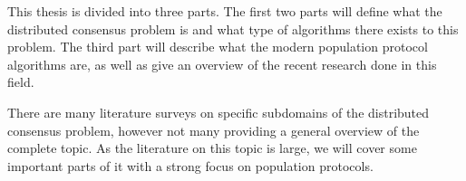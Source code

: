 This thesis is divided into three parts. The first two parts will define what the distributed consensus problem is and what type of algorithms there exists to this problem. The third part will describe what the modern population protocol algorithms are, as well as give an overview of the recent research done in this field.

There are many literature surveys on specific subdomains of the distributed consensus problem, however not many providing a general overview of the complete topic. As the literature on this topic is large, we will cover some important parts of it with a strong focus on population protocols.



\clearpage